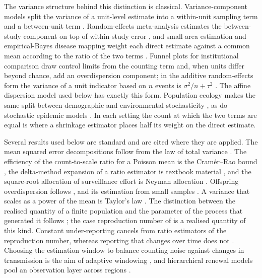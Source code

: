 The variance structure behind this distinction is classical. Variance-component models split the variance of a unit-level estimate into a within-unit sampling term and a between-unit term \citep{searle1992variance, cochran1977sampling}. Random-effects meta-analysis estimates the between-study component on top of within-study error \citep{dersimonian1986meta}, and small-area estimation and empirical-Bayes disease mapping weight each direct estimate against a common mean according to the ratio of the two terms \citep{fay1979estimates, clayton1987empirical, gelman1999maps}. Funnel plots for institutional comparison draw control limits from the counting term and, when units differ beyond chance, add an overdispersion component; in the additive random-effects form the variance of a unit indicator based on $n$ events is $\sigma^2/n+\tau^2$ \citep{spiegelhalter2005funnel, spiegelhalter2012statistical}. The affine dispersion model used below has exactly this form. Population ecology makes the same split between demographic and environmental stochasticity \citep{engen1998demographic, lande2003stochastic}, as do stochastic epidemic models \citep{breto2009time, he2010plug}. In each setting the count at which the two terms are equal is where a shrinkage estimator places half its weight on the direct estimate.

Several results used below are standard and are cited where they are applied. The mean squared error decompositions follow from the law of total variance \citep{searle1992variance, casella2002statistical}. The efficiency of the count-to-scale ratio for a Poisson mean is the Cramér--Rao bound \citep{lehmann1998theory}, the delta-method expansion of a ratio estimator is textbook material \citep{casella2002statistical}, and the square-root allocation of surveillance effort is Neyman allocation \citep{cochran1977sampling}. Offspring overdispersion follows \citet{lloydsmith2005superspreading}, and its estimation from small samples \citet{lloydsmith2007maximum}. A variance that scales as a power of the mean is Taylor's law \citep{taylor1961aggregation}. The distinction between the realised quantity of a finite population and the parameter of the process that generated it follows \citet{graubard2002inference}; the case reproduction number of \citet{wallinga2004different} is a realised quantity of this kind. Constant under-reporting cancels from ratio estimators of the reproduction number, whereas reporting that changes over time does not \citep{cori2013new, gostic2020practical}. Choosing the estimation window to balance counting noise against changes in transmission is the aim of adaptive windowing \citep{parag2020adaptive}, and hierarchical renewal models pool an observation layer across regions \citep{bhatt2023semi}.

